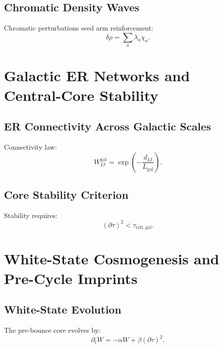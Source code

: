 \section{Chromatic Density Waves}
Chromatic perturbations seed arm reinforcement:
\[
\delta\rho = \sum_a \lambda_a \chi_a.
\]



\chapter{Galactic ER Networks and Central-Core Stability}

\section{ER Connectivity Across Galactic Scales}
Connectivity law:
\[
W_{IJ}^{\mathrm{gal}} = \exp\!\left(-\frac{d_{IJ}}{L_{\mathrm{gal}}}\right).
\]

\section{Core Stability Criterion}
Stability requires:
\[
(\partial\tau)^2 < \tau_{\mathrm{crit,gal}}.
\]



\chapter{White-State Cosmogenesis and Pre-Cycle Imprints}

\section{White-State Evolution}
The pre-bounce core evolves by:
\[
\partial_t W = -\alpha W + \beta (\partial\tau)^2.
\]

